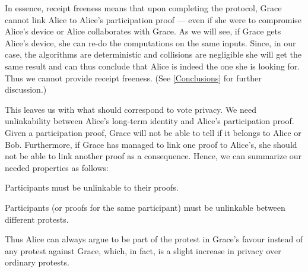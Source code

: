 In essence, receipt freeness means that upon completing the protocol, Grace 
cannot link Alice to Alice's participation proof --- even if she were to 
compromise Alice's device or Alice collaborates with Grace.
As we will see, if Grace gets Alice's device, she can re-do the computations on 
the same inputs.
Since, in our case, the algorithms are deterministic and collisions are 
negligible she will get the same result and can thus conclude that Alice is 
indeed the one she is looking for.
Thus we cannot provide receipt freeness.
(See \cref{Conclusions} for further discussion.)

This leaves us with what should correspond to vote privacy.
We need unlinkability between Alice's long-term identity and Alice's 
participation proof.
Given a participation proof, Grace will not be able to tell if it belongs to 
Alice or Bob.
Furthermore, if Grace has managed to link one proof to Alice's, she should not 
be able to link another proof as a consequence.
Hence, we can summarize our needed properties as follows:
\begin{requirements}[P]
\item\label{ProofUnlink} Participants must be unlinkable to their proofs.
\item\label{ProtestUnlink} Participants (or proofs for the same participant) 
  must be unlinkable between different protests.
\end{requirements}
Thus Alice can always argue to be part of the protest in Grace's favour instead 
of any protest against Grace, which, in fact, is a slight increase in privacy 
over ordinary protests.

